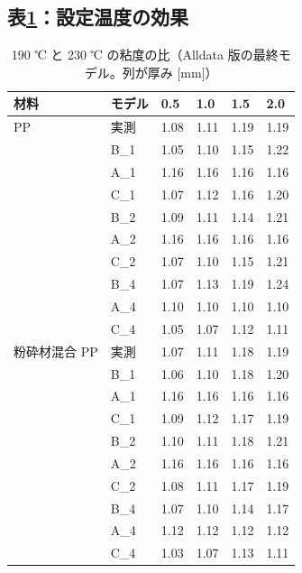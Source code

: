\documentclass[paper=a4paper,fontsize=10.5pt,line_length=44zw,number_of_lines=38]{jlreq}
\begin{document}
\subsection{表\ref{tab:tset}：設定温度の効果}
\begin{table}[H]
\caption{190 ℃ と 230 ℃ の粘度の比（Alldata 版の最終モデル。列が厚み [mm]）}\label{tab:tset}
\small
\begin{tabularx}{\linewidth}{@{}llXXXX@{}}
\toprule
材料 & モデル & 0.5 & 1.0 & 1.5 & 2.0 \\
\midrule
PP & 実測 & 1.08 & 1.11 & 1.19 & 1.19 \\
 & B\_1 & 1.05 & 1.10 & 1.15 & 1.22 \\
 & A\_1 & 1.16 & 1.16 & 1.16 & 1.16 \\
 & C\_1 & 1.07 & 1.12 & 1.16 & 1.20 \\
 & B\_2 & 1.09 & 1.11 & 1.14 & 1.21 \\
 & A\_2 & 1.16 & 1.16 & 1.16 & 1.16 \\
 & C\_2 & 1.07 & 1.10 & 1.15 & 1.21 \\
 & B\_4 & 1.07 & 1.13 & 1.19 & 1.24 \\
 & A\_4 & 1.10 & 1.10 & 1.10 & 1.10 \\
 & C\_4 & 1.05 & 1.07 & 1.12 & 1.11 \\
\midrule
粉砕材混合 PP & 実測 & 1.07 & 1.11 & 1.18 & 1.19 \\
 & B\_1 & 1.06 & 1.10 & 1.18 & 1.20 \\
 & A\_1 & 1.16 & 1.16 & 1.16 & 1.16 \\
 & C\_1 & 1.09 & 1.12 & 1.17 & 1.19 \\
 & B\_2 & 1.10 & 1.11 & 1.18 & 1.21 \\
 & A\_2 & 1.16 & 1.16 & 1.16 & 1.16 \\
 & C\_2 & 1.08 & 1.11 & 1.17 & 1.19 \\
 & B\_4 & 1.07 & 1.10 & 1.14 & 1.17 \\
 & A\_4 & 1.12 & 1.12 & 1.12 & 1.12 \\
 & C\_4 & 1.03 & 1.07 & 1.13 & 1.11 \\

\bottomrule
\end{tabularx}
\end{table}
\end{document}
